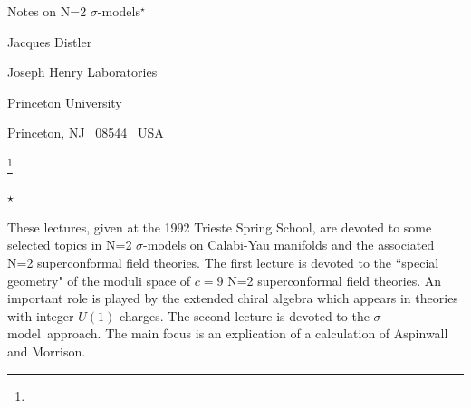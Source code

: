 
\def\undertext#1{$\underline{\smash{\hbox{#1}}}$}
\def\ket#1{| #1 \rangle}         %
\def\bra#1{\langle #1 |}         %
\def\melt#1#2#3{\langle #1 \mid #2 \mid #3\rangle} %
%

\def\del{\partial}
\def\delb{\overline{\del}} %
\def\lwedge{{\textstyle \bigwedge}} %
\def\fourpt{\hbox{{$\rangle \kern-.25em \langle$}}} %
\def\tree{\hbox{{$\rangle \kern-.5em - \kern-.5em \langle$}}}%
\def\ib{{\bar \imath}} %
\def\jb{{\bar \jmath}} %
\def\kb{{\bar k}}
\def\zb{{\bar z}}\def\yb{{\bar y}}
\def\H#1#2{{\rm H}^{#1}(#2)} %
\def\CZ{{\cal Z}}
\def\ex#1{{\rm e}^{#1}}                 %
\def\dd{\mskip 1.3mu{\rm d}\mskip .7mu} %
\def\eg{{\it e.g.}}\def\ie{{\it i.e.}}\def\etc{{\it etc.}}

\def\cp#1{{\BC{\rm P}^{#1}}}

\def\Ka{K\"ahler}
\def\sm{$\sigma$-model}
\noblackbox




{Notes on N=2 $\sigma$-models$^\star$}

\centerline{Jacques Distler}\smallskip
\centerline{Joseph Henry Laboratories}
\centerline{Princeton University}
\centerline{Princeton, NJ \ 08544 \ USA}
\bigskip\bigskip

\footnote{}{{\parindent=-10pt\par $\star$
     }}
\def\myab{The first lecture is devoted to the
``special geometry" of the moduli space of $c=9$
N=2 superconformal field theories. An important role is played by the extended
chiral algebra which appears in theories with integer $U(1)$ charges.
The second lecture is devoted to the \sm\ approach. The main focus is an
explication of a calculation of Aspinwall and Morrison.}

These lectures, given at the 1992 Trieste Spring School, are devoted to some
selected topics in N=2 \sm s on Calabi-Yau manifolds and the associated
N=2 superconformal field theories. \myab

